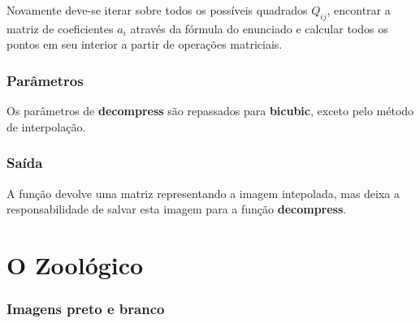 \documentclass[leqno]{article}
\begin{document}
Novamente deve-se iterar sobre todos os possíveis quadrados $Q_{ij}$, encontrar a
matriz de coeficientes $a_i$ através da fórmula do enunciado e calcular todos
os pontos em seu interior a partir de operações matriciais.

\subsubsection{Parâmetros}
Os parâmetros de \textbf{decompress} são repassados para \textbf{bicubic},
exceto pelo método de interpolação.

\subsubsection{Saída}
A função devolve uma matriz representando a imagem intepolada, mas deixa a
responsabilidade de salvar esta imagem para a função \textbf{decompress}.


\section{O Zoológico}

\subsubsection*{Imagens preto e branco}
\end{document}
